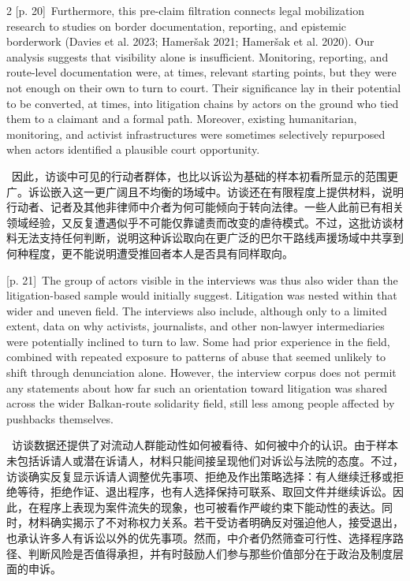 \documentclass[10pt,a4paper]{article}
\begin{document}
\begin{paracol}{2}
\switchcolumn
{\scriptsize\color{gray} [p. 20]}\ Furthermore, this pre-claim filtration connects legal mobilization research to studies on border documentation, reporting, and epistemic borderwork (Davies et al. 2023; Hameršak 2021; Hameršak et al. 2020). Our analysis suggests that visibility alone is insufficient. Monitoring, reporting, and route-level documentation were, at times, relevant starting points, but they were not enough on their own to turn to court. Their significance lay in their potential to be converted, at times, into litigation chains by actors on the ground who tied them to a claimant and a formal path. Moreover, existing humanitarian, monitoring, and activist infrastructures were sometimes selectively repurposed when actors identified a plausible court opportunity.\par
\switchcolumn*
{\scriptsize\color{gray} [p. 21]}\ 因此，访谈中可见的行动者群体，也比以诉讼为基础的样本初看所显示的范围更广。诉讼嵌入这一更广阔且不均衡的场域中。访谈还在有限程度上提供材料，说明行动者、记者及其他非律师中介者为何可能倾向于转向法律。一些人此前已有相关领域经验，又反复遭遇似乎不可能仅靠谴责而改变的虐待模式。不过，这批访谈材料无法支持任何判断，说明这种诉讼取向在更广泛的巴尔干路线声援场域中共享到何种程度，更不能说明遭受推回者本人是否具有同样取向。\par
\switchcolumn
{\scriptsize\color{gray} [p. 21]}\ The group of actors visible in the interviews was thus also wider than the litigation-based sample would initially suggest. Litigation was nested within that wider and uneven field. The interviews also include, although only to a limited extent, data on why activists, journalists, and other non-lawyer intermediaries were potentially inclined to turn to law. Some had prior experience in the field, combined with repeated exposure to patterns of abuse that seemed unlikely to shift through denunciation alone. However, the interview corpus does not permit any statements about how far such an orientation toward litigation was shared across the wider Balkan-route solidarity field, still less among people affected by pushbacks themselves.\par
\switchcolumn*
{\scriptsize\color{gray} [p. 21]}\ 访谈数据还提供了对流动人群能动性如何被看待、如何被中介的认识。由于样本未包括诉请人或潜在诉请人，材料只能间接呈现他们对诉讼与法院的态度。不过，访谈确实反复显示诉请人调整优先事项、拒绝及作出策略选择：有人继续迁移或拒绝等待，拒绝作证、退出程序，也有人选择保持可联系、取回文件并继续诉讼。因此，在程序上表现为案件流失的现象，也可被看作严峻约束下能动性的表达。同时，材料确实揭示了不对称权力关系。若干受访者明确反对强迫他人，接受退出，也承认许多人有诉讼以外的优先事项。然而，中介者仍然筛查可行性、选择程序路径、判断风险是否值得承担，并有时鼓励人们参与那些价值部分在于政治及制度层面的申诉。\par

\end{paracol}
\end{document}
